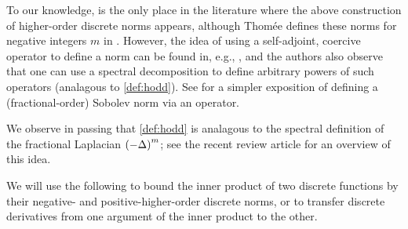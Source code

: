 

To our knowledge, \cite{DuWu:15} is the only place in the literature where the above construction of higher-order discrete norms appears, although Thom\'{e}e defines these norms for negative integers $m$ in \cite[Equation above Lemma 1]{Th:80}. However, the idea of using a self-adjoint, coercive operator to define a norm can be found in, e.g., \cite[Section 2.1]{LiMa:72}, and the authors also observe \cite[Text at the bottom of page 9]{LiMa:72} that one can use a spectral decomposition to define arbitrary powers of such operators (analagous to \cref{def:hodd}). See \cite[Section 2.1]{BaKuMa:19} for a simpler exposition of defining a (fractional-order) Sobolev norm via an operator.

We observe in passing that \cref{def:hodd} is analagous to the spectral definition of the fractional Laplacian $\mleft(-\Delta\mright)^m$; see the recent review article \cite[Section 2.5.1]{LiPaGuSoGlZhMaCaMeAiKa:18} for an overview of this idea.
\ere

We will use the following  to bound the inner product of two discrete functions by their negative- and positive-higher-order discrete norms, or to transfer discrete derivatives from one argument of the inner product to the other.

